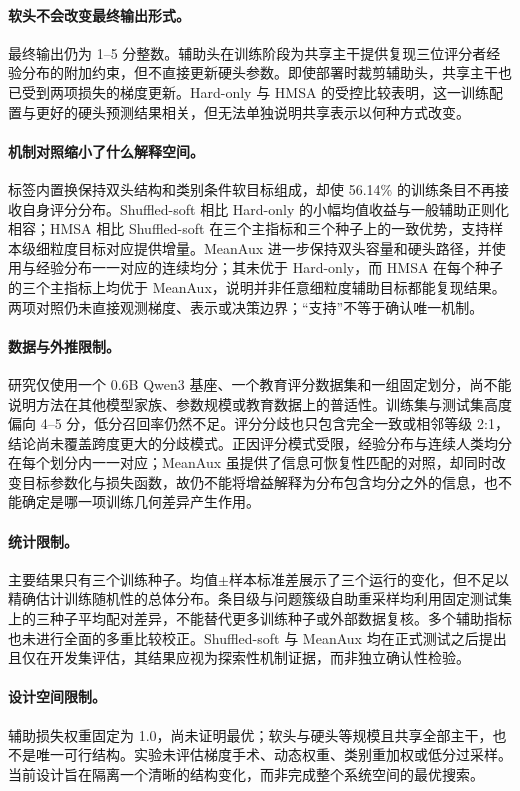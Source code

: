 \documentclass[UTF8,fontset=fandol,a4paper,11pt]{ctexart}
\begin{document}
\paragraph{软头不会改变最终输出形式。}
最终输出仍为 1--5 分整数。辅助头在训练阶段为共享主干提供复现三位评分者经验分布的附加约束，但不直接更新硬头参数。即使部署时裁剪辅助头，共享主干也已受到两项损失的梯度更新。Hard-only 与 HMSA 的受控比较表明，这一训练配置与更好的硬头预测结果相关，但无法单独说明共享表示以何种方式改变。

\paragraph{机制对照缩小了什么解释空间。}
标签内置换保持双头结构和类别条件软目标组成，却使 56.14\% 的训练条目不再接收自身评分分布。Shuffled-soft 相比 Hard-only 的小幅均值收益与一般辅助正则化相容；HMSA 相比 Shuffled-soft 在三个主指标和三个种子上的一致优势，支持样本级细粒度目标对应提供增量。MeanAux 进一步保持双头容量和硬头路径，并使用与经验分布一一对应的连续均分；其未优于 Hard-only，而 HMSA 在每个种子的三个主指标上均优于 MeanAux，说明并非任意细粒度辅助目标都能复现结果。两项对照仍未直接观测梯度、表示或决策边界；“支持”不等于确认唯一机制。

\paragraph{数据与外推限制。}
研究仅使用一个 0.6B Qwen3 基座、一个教育评分数据集和一组固定划分，尚不能说明方法在其他模型家族、参数规模或教育数据上的普适性。训练集与测试集高度偏向 4--5 分，低分召回率仍然不足。评分分歧也只包含完全一致或相邻等级 2:1，结论尚未覆盖跨度更大的分歧模式。正因评分模式受限，经验分布与连续人类均分在每个划分内一一对应；MeanAux 虽提供了信息可恢复性匹配的对照，却同时改变目标参数化与损失函数，故仍不能将增益解释为分布包含均分之外的信息，也不能确定是哪一项训练几何差异产生作用。

\paragraph{统计限制。}
主要结果只有三个训练种子。均值$\pm$样本标准差展示了三个运行的变化，但不足以精确估计训练随机性的总体分布。条目级与问题簇级自助重采样均利用固定测试集上的三种子平均配对差异，不能替代更多训练种子或外部数据复核。多个辅助指标也未进行全面的多重比较校正。Shuffled-soft 与 MeanAux 均在正式测试之后提出且仅在开发集评估，其结果应视为探索性机制证据，而非独立确认性检验。

\paragraph{设计空间限制。}
辅助损失权重固定为 1.0，尚未证明最优；软头与硬头等规模且共享全部主干，也不是唯一可行结构。实验未评估梯度手术、动态权重、类别重加权或低分过采样。当前设计旨在隔离一个清晰的结构变化，而非完成整个系统空间的最优搜索。
\end{document}
